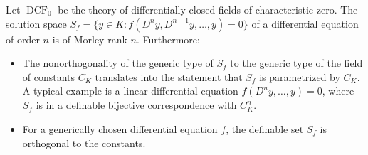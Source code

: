 Let $\operatorname{DCF}_0$ be the theory of differentially closed fields of characteristic zero. The solution space $S_f = \{y \in K : f(D^n y, D^{n-1} y, \ldots, y) = 0\}$ of a differential equation of order $n$ is of Morley rank $n$. Furthermore:

\begin{itemize}
\item The nonorthogonality of the generic type of $S_f$ to the generic type of the field of constants $C_K$ translates into the statement that $S_f$ is parametrized by $C_K$. A typical example is a linear differential equation $f(D^n y, \ldots, y) = 0$, where $S_f$ is in a definable bijective correspondence with $C_K^n$.
\item For a generically chosen differential equation $f$, the definable set $S_f$ is orthogonal to the constants.
\end{itemize}
